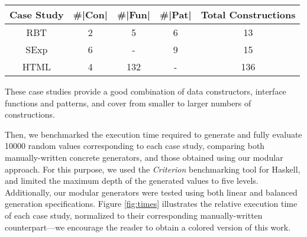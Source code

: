\begin{table}[H]
  \begin{tabular}{||c||c||c||c||c||}
    \hline
    Case Study & \#|Con| & \#|Fun| & \#|Pat| & Total Constructions \\ \hline
    \hline
    RBT        & 2       & 5       & 6       & 13                  \\ \hline
    SExp       & 6       & -       & 9       & 15                  \\ \hline
    HTML       & 4       & 132     & -       & 136                 \\ \hline
  \end{tabular}
\end{table}

These case studies provide a good combination of data constructors, interface
functions and patterns, and cover from smaller to larger numbers of
constructions.


Then, we benchmarked the execution time required to generate and fully evaluate
10000 random values corresponding to each case study, comparing both
manually-written concrete generators, and those obtained using our modular
approach.
%
For this purpose, we used the \emph{Criterion} \cite{criterion} benchmarking
tool for Haskell, and limited the maximum depth of the generated values to five
levels.
%
Additionally, our modular generators were tested using both linear and balanced
generation specifications.
%
Figure \ref{fig:times} illustrates the relative execution time of each case
study, normalized to their corresponding manually-written counterpart---we
encourage the reader to obtain a colored version of this work.

